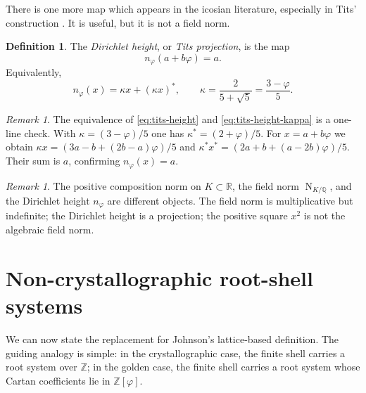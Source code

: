 \documentclass[12pt,oneside,english]{amsart}
\numberwithin{equation}{section}
\numberwithin{figure}{section}
\numberwithin{table}{section}
\theoremstyle{plain}
\theoremstyle{definition}
\newtheorem{definition}[theorem]{Definition}
\theoremstyle{remark}
\newtheorem{remark}[theorem]{Remark}
\newcommand{\ZZ}{\mathbb Z}
\newcommand{\QQ}{\mathbb Q}
\newcommand{\RR}{\mathbb R}
\newcommand{\Zphi}{\mathbb Z[\varphi]}
\newcommand{\Norm}{\operatorname{N}}
\begin{document}
There is one more map which appears in the icosian literature, especially in Tits' construction \cite{Ti80}. It is useful, but it is not a field norm.

\begin{definition}
The \emph{Dirichlet height}, or \emph{Tits projection}, is the map
\begin{equation}
n_\varphi(a+b\varphi)=a.
\label{eq:tits-height}
\end{equation}
Equivalently,
\begin{equation}
n_\varphi(x)=\kappa x+(\kappa x)^*,
\qquad
\kappa=\frac{2}{5+\sqrt5}=\frac{3-\varphi}{5}.
\label{eq:tits-height-kappa}
\end{equation}
\end{definition}

\begin{remark}
The equivalence of \eqref{eq:tits-height} and \eqref{eq:tits-height-kappa} is a one-line check. With \(\kappa=(3-\varphi)/5\) one has \(\kappa^*=(2+\varphi)/5\). For \(x=a+b\varphi\) we obtain \(\kappa x=(3a-b+(2b-a)\varphi)/5\) and \(\kappa^* x^*=(2a+b+(a-2b)\varphi)/5\). Their sum is \(a\), confirming \(n_\varphi(x)=a\).
\end{remark}

\begin{remark}
The positive composition norm on \(K\subset\RR\), the field norm \(\Norm_{K/\QQ}\), and the Dirichlet height \(n_\varphi\) are different objects. The field norm is multiplicative but indefinite; the Dirichlet height is a projection; the positive square \(x^2\) is not the algebraic field norm.
\end{remark}

\section{Non-crystallographic root-shell systems}

We can now state the replacement for Johnson's lattice-based definition. The guiding analogy is simple: in the crystallographic case, the finite shell carries a root system over \(\ZZ\); in the golden case, the finite shell carries a root system whose Cartan coefficients lie in \(\Zphi\).
\end{document}
